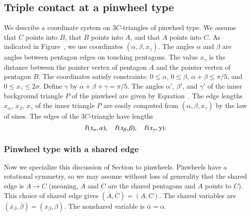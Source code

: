 \subsection{Triple contact at a pinwheel type}

We describe a coordinate system on $3C$-triangles of pinwheel type.
We assume that $C$ points into $B$, that $B$ points into $A$, and that
$A$ points into $C$.  As indicated in Figure~,
we use coordinates $(\alpha,\beta,x_\gamma)$.  The angles $\alpha$ and
$\beta$ are angles between pentagon edges on touching pentagons.  The
value $x_\gamma$ is the distance between the pointer vertex of
pentagon $A$ and the pointer vertex of pentagon $B$.  The coordinates
satisfy constraints: $0\le\alpha$, $0\le\beta$, $\alpha+\beta\le
\pi/5$, and $0\le x_\gamma\le 2\sigma$.  Define $\gamma$ by
$\alpha+\beta+\gamma=\pi/5$.  The angles $\alpha'$, $\beta'$, and
$\gamma'$ of the inner background triangle $P$ of the pinwheel are
given by Equation~.  The edge lengths $x_\alpha$,
$x_\beta$, $x_\gamma$ of the inner triangle $P$ are easily computed
from $(\alpha,\beta,x_\gamma)$ by the law of sines.  The edges of the
$3C$-triangle have lengths
\[
\ell(x_\alpha,\alpha),\quad 
\ell(x_\beta,\beta),\quad \ell(x_\gamma,\gamma).
\]



\subsubsection{Pinwheel type with a shared edge}

Now we specialize this discussion of Section  to
pinwheels.  Pinwheels have a rotational symmetry, so we may assume
without loss of generality that the shared edge is $A\to C$ (meaning,
$A$ and $C$ are the shared pentagons and $A$ points to $C$).  This
choice of shared edge gives $(\bar A,\bar C) = (A,C)$.  The shared
variables are $(\bar x_\beta,\bar\beta)=(x_\beta,\beta)$.  The
nonshared variable is $\bar\alpha=\alpha$.


